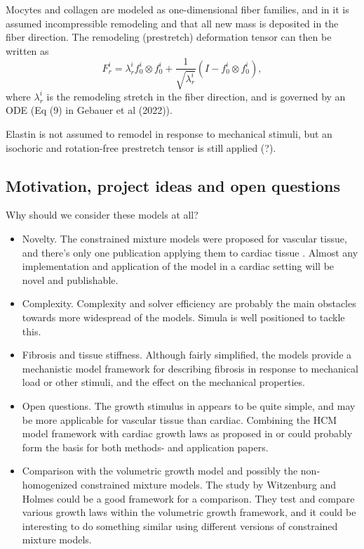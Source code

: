 \documentclass[twoside,12pt,a4paper]{article}
\begin{document}
Mocytes and collagen are modeled as one-dimensional fiber families, and in \cite{gebauer2022homogenized} 
it is assumed incompressible remodeling and that all new mass is deposited in the fiber direction. The remodeling (prestretch) deformation tensor can 
then be written as
\[
F_r^i = \lambda_r^i f_0^i \otimes f_0^i  +\frac{1}{\sqrt{\lambda_r^i}}(I-f_0^i \otimes f_0^i),
\]
where $\lambda_r^i$ is the remodeling stretch in the fiber direction, and is governed by an ODE (Eq (9) in Gebauer et al (2022)).

Elastin is not assumed to remodel in response to mechanical stimuli, but an isochoric and rotation-free prestretch tensor is 
still applied (?).

\subsection{Motivation, project ideas and open questions}
Why should we consider these models at all?
\begin{itemize}
  \item Novelty. The constrained mixture models were proposed for vascular tissue, and there's only one publication applying
        them to cardiac tissue \cite{gebauer2022homogenized}. Almost any implementation and application of the model in a cardiac 
        setting will be novel and publishable.
  \item Complexity. Complexity and solver efficiency are probably the main obstacles towards more widespread of the models. 
        Simula is well positioned to tackle this.
  \item Fibrosis and tissue stiffness. Although fairly simplified, the models provide a mechanistic model framework for 
        describing fibrosis in response to mechanical load or other stimuli, and the effect on the mechanical properties.
  \item Open questions. The growth stimulus in \cite{gebauer2022homogenized} appears to be quite simple, and may be more applicable 
        for vascular tissue than cardiac. Combining the HCM model framework with cardiac growth laws as proposed in
        \cite{kerckhoffs2012single} or \cite{lee2016integrated} could probably form the basis for both methods- and application papers.
  \item Comparison with the volumetric growth model and possibly the non-homogenized constrained mixture models. The study 
        by Witzenburg and Holmes \cite{witzenburg2017comparison} could be a good framework for a comparison. They test and compare various growth
        laws within the volumetric growth framework, and it could be interesting to do something similar using different
        versions of constrained mixture models. 
\end{itemize}
\end{document}
